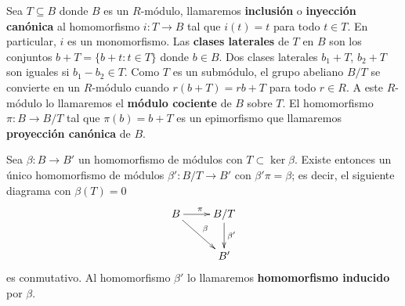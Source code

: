Sea \(T \subseteq B\) donde \(B\) es un \(R\)-módulo, llamaremos \textbf{inclusión} o \textbf{inyección
canónica} al homomorfismo \(i: T \rightarrow B\) tal que \(i(t) = t\) para todo
\(t \in T\). En particular, \(i\) es un monomorfismo. Las \textbf{clases laterales}
de \(T\) en \(B\) son los conjuntos \(b + T = \{b + t : t \in T\}\) donde \(b \in B\). Dos
clases laterales \(b_{1} + T\), \(b_{2} + T\) son iguales si \(b_{1} - b_{2} \in T\). Como
\(T\) es un submódulo, el grupo abeliano \(B/T\) se convierte en un \(R\)-módulo
cuando \(r(b+T) = rb + T\) para todo \(r \in R\). A este \(R\)-módulo lo llamaremos el
\textbf{módulo cociente} de \(B\) sobre \(T\). El homomorfismo \(\pi: B \rightarrow B/
T\) tal que \(\pi(b) = b + T\) es un epimorfismo que llamaremos \textbf{proyección
canónica} de \(B\).

\begin{proposicion}
	 \label{prop:teo-fact} Sea \(\beta: B \rightarrow B'\)
	un homomorfismo de módulos con \(T \subset \ker \beta\). Existe entonces un
	único homomorfismo de módulos \(\beta': B/T \rightarrow B'\) con
	\(\beta'\pi = \beta\); es decir, el siguiente diagrama con \(\beta(T) = 0\)
	\begin{equation}
		\label{firstisothm}\xymatrix{ B \ar[r]^\pi \ar[dr]^\beta & B/T \ar[d]^{\beta'} \\ & B' }
	\end{equation}
	es conmutativo. Al homomorfismo \(\beta'\) lo llamaremos \textbf{homomorfismo
	inducido} por \(\beta\).
\end{proposicion}
